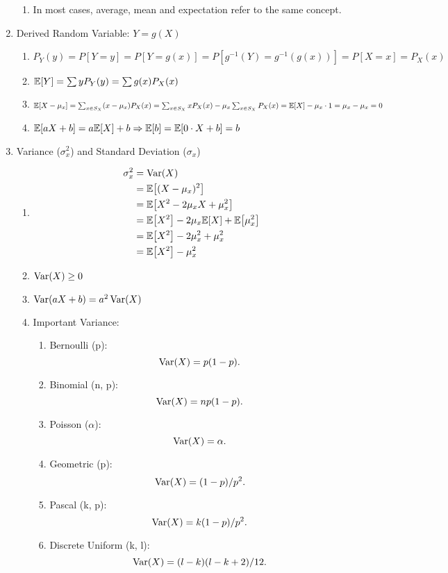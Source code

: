\begin{enumerate}
{\begin{enumerate}
            \item In most cases, average, mean and expectation refer to the same concept. 
        \end{enumerate}
    }
    \item Derived Random Variable: $Y = g(X)${
        \begin{enumerate}
            \item $P_Y(y) = P[Y=y] = P[Y=g(x)] = P[g^{-1}(Y)=g^{-1}(g(x))] = P[X=x] = P_X(x)$
            \item $\E{Y} = \sum yP_Y(y) = \sum g(x)P_X(x)$
            \item $\E{X-\mu_x}=\sum_{x\in S_X}(x-\mu_x)P_X(x)=\sum_{x\in S_X}xP_X(x)-\mu_x\sum_{x\in S_X}P_X(x)=\E{X}-\mu_x\cdot 1=\mu_x-\mu_x=0$
            \item $\E{aX+b}=a\E{X}+b \Rightarrow \E{b}=\E{0\cdot X+b}=b$
        \end{enumerate}
    }
    \item Variance ($\sigma_x^2$) and Standard Deviation ($\sigma_x$){
        \begin{enumerate}
            \item {
                \begin{align*}
                    \sigma_x^2 
                    &= \Var(X) \\
                    &= \E{(X-\mu_x)^2} \\
                    &= \E{X^2-2\mu_x X+\mu_x^2} \\
                    &= \E{X^2}-2\mu_x\E{X}+\E{\mu_x^2} \\
                    &= \E{X^2}-2\mu_x^2+\mu_x^2 \\
                    &= \E{X^2}-\mu_x^2
                \end{align*}
            }
            \item $\mathop{\mathrm{Var}}\nolimits(X)\geq 0$
            \item $\mathop{\mathrm{Var}}\nolimits(aX+b)=a^2\mathop{\mathrm{Var}}\nolimits(X)$
            \item Important Variance:{
                \begin{enumerate}
                    \item Bernoulli (p): \[\mathop{\mathrm{Var}}\nolimits(X)=p(1-p).\]
                    \item Binomial (n, p): \[\mathop{\mathrm{Var}}\nolimits(X)=np(1-p).\]
                    \item Poisson ($\alpha$): \[\mathop{\mathrm{Var}}\nolimits(X)=\alpha.\]
                    \item Geometric (p): \[\mathop{\mathrm{Var}}\nolimits(X)=(1-p)/p^2.\]
                    \item Pascal (k, p): \[\mathop{\mathrm{Var}}\nolimits(X)=k(1-p)/p^2.\]
                    \item Discrete Uniform (k, l): \[\mathop{\mathrm{Var}}\nolimits(X)=(l-k)(l-k+2)/12.\]
                \end{enumerate}
            }
        \end{enumerate}
    }
\end{enumerate}